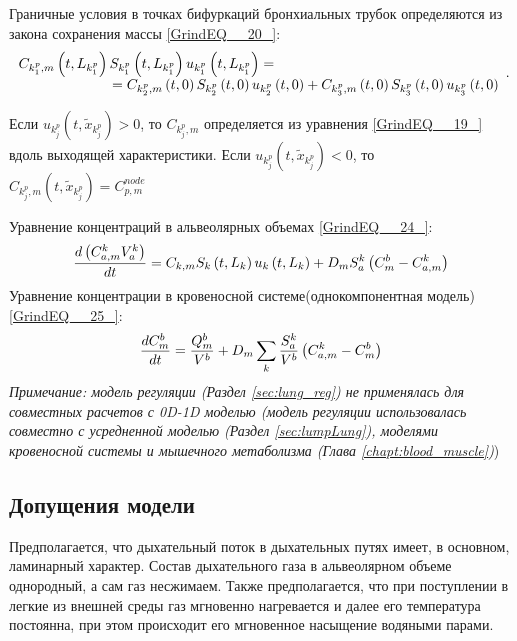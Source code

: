 Граничные условия в точках бифуркаций бронхиальных трубок определяются из закона сохранения массы \eqref{GrindEQ__20_}:
\begin{equation} 
\begin{array}{l} {C_{k_{1}^{p} ,m} \left(t,L_{k_{1}^{p} } \right)S_{k_{1}^{p} } \left(t,L_{k_{1}^{p} } \right)u_{k_{1}^{p} } \left(t,L_{k_{1}^{p} } \right)=} \\ {\; \; \; \; \; \; \; \; \; \; \; \; \; \; \; \; \; \; \; \; \; \; \; \; =C_{k_{2}^{p} ,m} \left(t,0\right)S_{k_{2}^{p} } \left(t,0\right)u_{k_{2}^{p} } \left(t,0\right)+C_{k_{3}^{p} ,m} \left(t,0\right)S_{k_{3}^{p} } \left(t,0\right)u_{k_{3}^{p} } \left(t,0\right)} \end{array}.  \notag 
\end{equation} 

Если $u_{k_{j}^{p} } \left(t,\tilde{x}_{k_{j}^{p} } \right)>0$, то $C_{k_{j}^{p} ,m} $ определяется из уравнения \eqref{GrindEQ__19_} вдоль выходящей характеристики. Если $u_{k_{j}^{p} } \left(t,\tilde{x}_{k_{j}^{p} } \right)<0$, то $ C_{k_{j}^{p} ,m} \left(t,\tilde{x}_{k_{j}^{p} } \right)=C_{p,m}^{node}$ 



Уравнение концентраций в альвеолярных объемах \eqref{GrindEQ__24_}:
\begin{equation}  
\frac{d\left(C_{a,m}^{k} V_{a}^{k} \right)}{dt} =C_{k,m} S_{k} \left(t,L_{k} \right)u_{k} \left(t,L_{k} \right)+D_{m} S_{a}^{k} \left(C_{m}^{b} -C_{a,m}^{k} \right)\notag  
\end{equation} 
Уравнение концентрации в кровеносной системе(однокомпонентная модель) \eqref{GrindEQ__25_}:
\begin{equation} 
\frac{dC_{m}^{b} }{dt} =\frac{Q_{m}^{b} }{V^{b} } +D_{m} \sum _{k}\frac{S_{a}^{k} }{V^{b} } \left(C_{a,m}^{k} -C_{m}^{b} \right)\notag  
\end{equation}
\textit{Примечание: модель регуляции (Раздел \ref{sec:lung_reg}) не применялась для совместных расчетов с 0D-1D моделью (модель регуляции использовалась совместно с усредненной моделью (Раздел \ref{sec:lumpLung}), моделями кровеносной системы и мышечного метаболизма (Глава \ref{chapt:blood_muscle})})

\subsection{Допущения модели}
Предполагается, что дыхательный поток в дыхательных путях имеет, в основном, ламинарный характер. Состав дыхательного газа в альвеолярном объеме однородный, а сам газ несжимаем. Также предполагается, что при поступлении в легкие из внешней среды газ мгновенно нагревается и далее его температура постоянна, при этом происходит его мгновенное насыщение водяными парами.   

